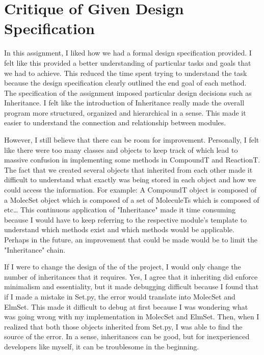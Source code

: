 \documentclass[12pt]{article}
\begin{document}
\section{Critique of Given Design Specification}
In this assignment, I liked how we had a formal design specification provided. I felt like this provided a better understanding of particular tasks and 
goals that we had to achieve. This reduced the time spent trying to understand the task because the design specification clearly outlined the end goal of 
each method. The specification of the assignment imposed particular design decisions such as Inheritance. I felt like the introduction of Inheritance really
made the overall program more structured, organized and hierarchical in a sense. This made it easier to understand the connection and relationship between modules.

However, I still believe that there can be room for improvement. Personally, I felt like there were too many classes and objects to 
keep track of which lead to massive confusion in implementing some methods in CompoundT and ReactionT. The fact that we created several
objects that inherited from each other made it difficult to understand what exactly was being stored in each object and how we could access
the information. For example: A CompoundT object is composed of a MolecSet object which is composed of a set of MoleculeTs which is composed of etc\dots
This continuous application of "Inheritance" made it time consuming because I would have to keep referring to the respective module's template to understand
which methods exist and which methods would be applicable. Perhaps in the future, an improvement that could be made would be to limit the "Inheritance" chain.

If I were to change the design of the of the project, I would only change the number of inheritances that it requires. Yes, I agree that it inheriting
did enforce minimalism and essentiality, but it made debugging difficult because I found that if I made a mistake in Set.py, the error would translate into
MolecSet and ElmSet. This made it difficult to debug at first because I was wondering what was going wrong with my implementation in MolecSet and ElmSet. Then, when I realized that 
both those objects inherited from Set.py, I was able to find the source of the error. In a sense, inheritances can be good, but for inexperienced developers like myself, it can be
troublesome in the beginning. 
\end{document}
